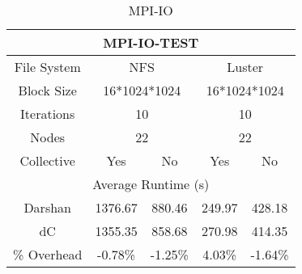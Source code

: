\begin{table}[h]
    \begin{subtable}[h]{0.45\textwidth}
    \vspace{0.5cm}
        \centering
        \setlength\tabcolsep{5pt}
        \begin{tabular}{|ccccc|}
        \hline
        \multicolumn{5}{|c|}{MPI-IO-TEST}                                                                                                                                \\ \hline
        \multicolumn{1}{|c|}{File System}      & \multicolumn{2}{c|}{NFS}                                              & \multicolumn{2}{c|}{Luster}                     \\ \hline
        \multicolumn{1}{|c|}{Block Size}       & \multicolumn{2}{c|}{16*1024*1024}                                     & \multicolumn{2}{c|}{16*1024*1024}               \\ \hline
        \multicolumn{1}{|c|}{Iterations}       & \multicolumn{2}{c|}{10}                                               & \multicolumn{2}{c|}{10}                         \\ \hline
        \multicolumn{1}{|c|}{Nodes}            & \multicolumn{2}{c|}{22}                                               & \multicolumn{2}{c|}{22}                         \\ \hline
        \multicolumn{1}{|c|}{Collective}       & \multicolumn{1}{c|}{Yes}          & \multicolumn{1}{c|}{No}           & \multicolumn{1}{c|}{Yes}         & No           \\ \hline
        \multicolumn{5}{|c|}{Average Runtime (s)}                                                                                                                            \\ \hline
        \multicolumn{1}{|c|}{Darshan}          & \multicolumn{1}{c|}{1376.67}  & \multicolumn{1}{c|}{880.46}  & \multicolumn{1}{c|}{249.97} & 428.18  \\ \hline
        \multicolumn{1}{|c|}{dC} & \multicolumn{1}{c|}{1355.35}  & \multicolumn{1}{c|}{858.68}  & \multicolumn{1}{c|}{270.98} & 414.35  \\ \hline
        \multicolumn{1}{|c|}{\% Overhead}      & \multicolumn{1}{c|}{-0.78\%} & \multicolumn{1}{c|}{-1.25\%} & \multicolumn{1}{c|}{4.03\%} & -1.64\% \\ \hline
        \end{tabular}
    \caption{MPI-IO} 
    \label{subtable:MPI-IO-TEST}
    \vspace{0.5cm}

\end{subtable}
\end{table}
